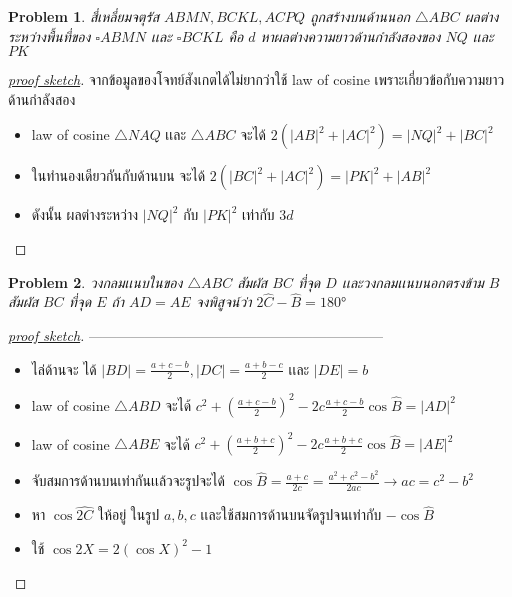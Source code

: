 \documentclass[a4paper,12pt]{article}
\newtheorem{problem}{Problem}[section]
\begin{document}
		\begin{problem}
			สี่เหลี่ยมจตุรัส $ABMN, BCKL, ACPQ$ ถูกสร้างบนด้านนอก $\bigtriangleup{ABC}$ ผลต่างระหว่างพื้นที่ของ $\square{ABMN}$ เเละ $\square{BCKL}$ คือ $d$ หาผลต่างความยาวด้านกำลังสองของ $NQ$ เเละ $PK$
		\end{problem}
		\begin{proof}[\underline{proof sketch}]
			จากข้อมูลของโจทย์สังเกตได้ไม่ยากว่าใช้ law of cosine เพราะเกี่ยวข้อกับความยาวด้านกำลังสอง
			\begin{itemize}
				\item law of cosine $\bigtriangleup{NAQ}$ เเละ $\bigtriangleup{ABC}$ จะได้ $2(|AB|^2 + |AC|^2) = |NQ|^2 + |BC|^2$
				\item ในทำนองเดียวกันกับด้านบน จะได้ $2(|BC|^2 + |AC|^2) = |PK|^2 + |AB|^2$
				\item ดังนั้น ผลต่างระหว่าง $|NQ|^2$ กับ $|PK|^2$ เท่ากับ $3d$
			\end{itemize}
			
		\end{proof}
		
		\begin{problem}
			วงกลมเเนบในของ $\bigtriangleup{ABC}$ สัมผัส $BC$ ที่จุด $D$ เเละวงกลมเเนบนอกตรงข้าม $B$ สัมผัส $BC$ ที่จุด $E$ ถ้า $AD = AE$ จงพิสูจน์ว่า $2\hat{C}-\hat{B}=\ang{180}$
		\end{problem}
		\begin{proof}[\underline{proof sketch}]
		---------------------------------------------------------------
		\begin{itemize}
			\item ไล่ด้านจะ ได้ $|BD| = \frac{a+c-b}{2}, |DC| = \frac{a+b-c}{2}$ เเละ $|DE| = b$
			\item law of cosine $\bigtriangleup{ABD}$ จะได้ $c^2 + (\frac{a+c-b}{2})^2 -2c\frac{a+c-b}{2}\cos{\hat{B}} = |AD|^2$
			\item law of cosine $\bigtriangleup{ABE}$ จะได้ $c^2 + (\frac{a+b+c}{2})^2 -2c\frac{a+b+c}{2}\cos{\hat{B}} = |AE|^2$
			\item จับสมการด้านบนเท่ากันเเล้วจะรูปจะได้ $\cos{\hat{B}} = \frac{a+c}{2c} = \frac{a^2+c^2-b^2}{2ac} \rightarrow ac = c^2 - b^2 $
			\item หา $\cos{\hat{2C}}$ ให้อยู่ ในรูป $a,b,c$ เเละใช้สมการด้านบนจัดรูปจนเท่ากับ  $-\cos{\hat{B}}$ 
			\item ใช้ $\cos2X = 2(\cos{X})^2 - 1$

		\end{itemize}
		\end{proof}
	
\end{document}
